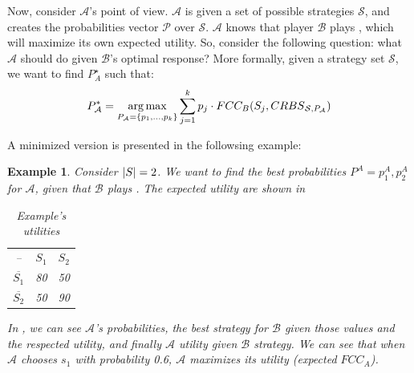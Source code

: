 \documentclass[a4paper,10pt]{article}
\newtheorem{Example}{Example}[section]
\newcommand{\fcc}{\ensuremath{FCC}\xspace}
\newcommand{\A}{\ensuremath{\mathcal{A}}\xspace}
\newcommand{\B}{\ensuremath{\mathcal{B}}\xspace}
\DeclarePairedDelimiter\abs{\lvert}{\rvert}%
\DeclareMathOperator*{\argmax}{arg\,max} %
\begin{document}
Now, consider \A's point of view. \A is given a set of possible strategies $\mathcal{S}$, and creates the probabilities vector $\mathcal{P}$ over $\mathcal{S}$.
\A knows that player \B plays \crbs, which will maximize its own expected utility.
So, consider the following question: what \A should do given \B's optimal response? More formally, given a strategy set $\mathcal{S}$, we want to find $P_A^\star$ such that:
\begin{equation} \label{equations: optimal Pa}
  P_{\A}^*=\argmax_{P_{\A}=\{p_1,...,p_k\}}\sum_{j=1}^{k}{p_j\cdot \fcc_B(S_j,\crbs[\mathcal{S}][P_{\A}])}  
\end{equation}


A minimized version is presented in the followsing example:

\begin{Example}

Consider $\abs{S}=2$. We want to find the best probabilities $P^A=p_1^A,p_2^A$ for \A, given that \B plays \crbs. The expected utility are shown in 

\begin{table}[h]
    \centering
    \begin{tabular}{c|c|c}
        --& $S_1$ & $S_2$\\
        $\overline{S_1}$ & 80 & 50\\ $\overline{S_2}$ & 50 & 90\\ 
    \end{tabular}
    \caption{Example's utilities}
    \label{tables:exmple's utilities}
\end{table}

In , we can see \A's probabilities, the best strategy for \B given those values and the respected utility, and finally \A utility given \B strategy.
We can see that when \A chooses $s_1$ with probability 0.6, \A maximizes its utility (expected $\fcc_A$).

\begin{table}[]
    \centering
    \begin{tabular}{|c|c|c|c|c|}


\end{tabular}
\end{table}
\end{Example}
\end{document}
